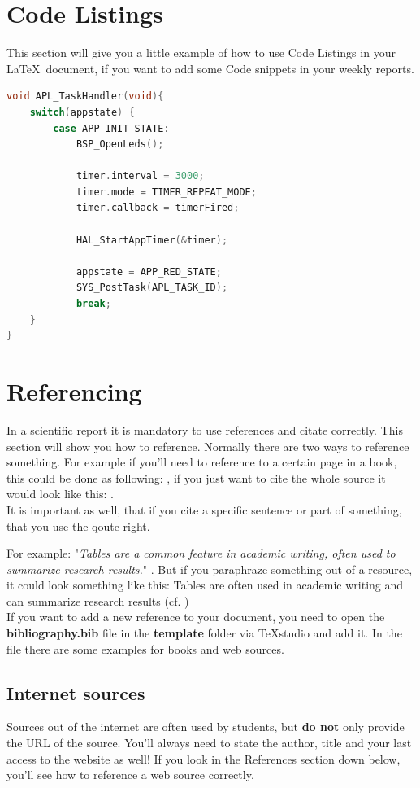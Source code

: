 \documentclass[]{article}
\begin{document}
\section{Code Listings}
This section will give you a little example of how to use Code Listings in your \LaTeX\ document, if you want to add some Code snippets in your weekly reports.

\begin{lstlisting}[language=C,frame=single, caption = Taskhandler of Router, label = task_router] 
void APL_TaskHandler(void){
	switch(appstate) {
		case APP_INIT_STATE:
			BSP_OpenLeds();

			timer.interval = 3000;
			timer.mode = TIMER_REPEAT_MODE;
			timer.callback = timerFired;

			HAL_StartAppTimer(&timer);

			appstate = APP_RED_STATE;
			SYS_PostTask(APL_TASK_ID);
			break; 
	}
}

\end{lstlisting} 


\section{Referencing}
In a scientific report it is mandatory to use references and citate correctly. This section will show you how to reference. Normally there are two ways to reference something. For example if you'll need to reference to a certain page in a book, this could be done as following: \cite[p.233]{zigbee}, if you just want to cite the whole source it would look like this: \cite{sharelatex}. \\

It is important as well, that if you cite a specific sentence or part of something, that you use the qoute right. 

For example: "\textit{Tables are a common feature in academic writing, often used to summarize research results.}" \cite{tables}. But if you paraphraze something out of a resource, it could look something like this: Tables are often used in academic writing and can summarize research results (cf. \cite{tables}) \\

If you want to add a new reference to your document, you need to open the \textbf{bibliography.bib} file in the \textbf{template} folder via TeXstudio and add it. In the file there are some examples for books and web sources. 

\subsection{Internet sources}
Sources out of the internet are often used by students, but \textbf{do not} only provide the URL of the source. You'll always need to state the author, title and your last access to the website as well! If you look in the References section down below, you'll see how to reference a web source correctly. 


\printbibliography
\end{document}
